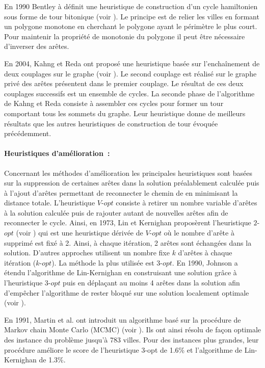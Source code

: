 En 1990 Bentley à définit une heuristique de construction d'un cycle hamiltonien sous forme de tour bitonique (voir \cite{Bentley1990}). Le principe est de relier les villes en formant un polygone monotone en cherchant le polygone ayant le périmètre le plus court. Pour maintenir la propriété de monotonie du polygone il peut être nécessaire d'inverser des arêtes.

En 2004, Kahng et Reda ont proposé une heuristique basée sur l’enchaînement de deux couplages sur le graphe (voir \cite{Kahng2004}). Le second couplage est réalisé sur le graphe privé des arêtes présentent dans le premier couplage. Le résultat de ces deux couplages successifs est un ensemble de cycles. La seconde phase de l'algorithme de Kahng et Reda consiste à assembler ces cycles pour former un tour comportant tous les sommets du graphe. Leur heuristique donne de meilleurs résultats que les autres heuristiques de construction de tour évoquée précédemment.

\paragraph{Heuristiques d'amélioration~:}
\label{sec:tsp:resolution:approchee:amelioration}

Concernant les méthodes d'amélioration les principales heuristiques sont basées sur la suppression de certaines arêtes dans la solution préalablement calculée puis à l'ajout d'arêtes permettant de reconnecter le chemin de en minimisant la distance totale. L'heuristique $V$-$opt$ consiste à retirer un nombre variable d'arêtes à la solution calculée puis de rajouter autant de nouvelles arêtes afin de reconnecter le cycle. Ainsi, en 1973, Lin et Kernighan proposèrent l'heuristique $2$-$opt$ (voir \cite{Lin1973}) qui est une heuristique dérivée de $V$-$opt$ où le nombre d'arête à supprimé est fixé à 2. Ainsi, à chaque itération, 2 arêtes sont échangées dans la solution. D'autres approches utilisent un nombre fixe $k$ d'arêtes à chaque itération ($k$-$opt$). La méthode la plus utilisée est $3$-$opt$. En 1990, Johnson a étendu l'algorithme de Lin-Kernighan en construisant une solution grâce à l'heuristique $3$-$opt$ puis en déplaçant au moins 4 arêtes dans la solution afin d'empêcher l'algorithme de rester bloqué 
sur une solution localement optimale (voir \cite{Johnson1990}).

En 1991, Martin et al. ont introduit un algorithme basé sur la procédure de Markov chain Monte Carlo (MCMC) (voir \cite{Martin1991}). Ils ont ainsi résolu de façon optimale des instance du problème jusqu'à 783 villes. Pour des instances plus grandes, leur procédure améliore le score de l'heuristique 3-opt de 1.6\% et l'algorithme de Lin-Kernighan de 1.3\%.

